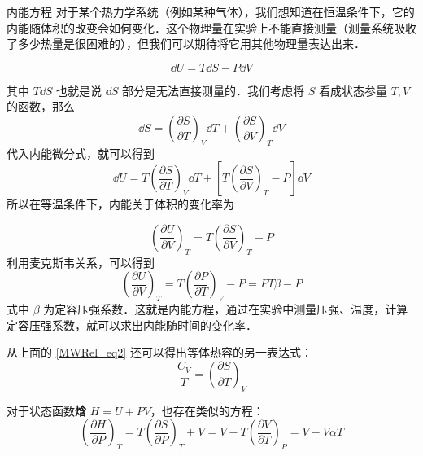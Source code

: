 \begin{example}{内能方程}
对于某个热力学系统（例如某种气体），我们想知道在恒温条件下，它的内能随体积的改变会如何变化．这个物理量在实验上不能直接测量（测量系统吸收了多少热量是很困难的），但我们可以期待将它用其他物理量表达出来．

\begin{equation}
\dd U=T\dd S-P\dd V
\end{equation}

其中 $T\dd S$ 也就是说 $\dd S$ 部分是无法直接测量的．我们考虑将 $S$ 看成状态参量 $T,V$ 的函数，那么 
\begin{equation}
\dd S=\left(\frac{\partial S}{\partial T}\right)_V \dd T+\left(\frac{\partial S}{\partial V}\right)_T \dd V
\end{equation}
代入内能微分式，就可以得到
\begin{equation}\label{MWRel_eq2}
\dd U=T\left(\frac{\partial S}{\partial T}\right)_V\dd T+\left[T\left(\frac{\partial S}{\partial V}\right)_T-P\right]\dd V
\end{equation}
所以在等温条件下，内能关于体积的变化率为

\begin{equation}
\left(\frac{\partial U}{\partial V}\right)_T=T\left(\frac{\partial S}{\partial V}\right)_T-P
\end{equation}
利用麦克斯韦关系，可以得到
\begin{equation}
\left(\frac{\partial U}{\partial V}\right)_T=T\left(\frac{\partial P}{\partial T}\right)_V-P=PT\beta-P
\end{equation}
式中 $\beta$ 为定容压强系数．这就是内能方程，通过在实验中测量压强、温度，计算定容压强系数，就可以求出内能随时间的变化率．

从上面的 \autoref{MWRel_eq2} 还可以得出等体热容的另一表达式：
\begin{equation}
\frac{C_V}{T}=\left(\frac{\partial S}{\partial T}\right)_V
\end{equation}

对于状态函数\textbf{焓} $H=U+PV$，也存在类似的方程：
\begin{equation}
\left(\frac{\partial H}{\partial P}\right)_T=T\left(\frac{\partial S}{\partial P}\right)_T+V
=V-T\left(\frac{\partial V}{\partial T}\right)_P=V-V\alpha T
\end{equation}

\end{example}

